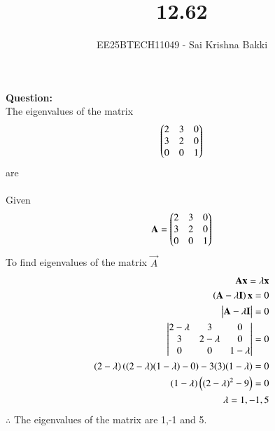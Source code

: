 \documentclass[journal]{IEEEtran}
\begin{document}

\vspace{3cm}

\title{12.62}
\author{EE25BTECH11049 - Sai Krishna Bakki}
\maketitle
\textbf{Question:}\\
The eigenvalues of the matrix 
\begin{align*}
    \begin{pmatrix}2&3&0\\3&2&0\\0&0&1\end{pmatrix}
\end{align*}
are\\
\solution\\
Given\\
\begin{align}
    \mathbf{A}=\begin{pmatrix}2&3&0\\3&2&0\\0&0&1\end{pmatrix}
\end{align}
To find eigenvalues of the matrix $\vec{A}$
\begin{align}
    \mathbf{A}\mathbf{x}=\lambda\mathbf{x}\\
    \left(\mathbf{A}-\lambda\mathbf{I}\right)\mathbf{x}=0\\
    \begin{vmatrix}\mathbf{A}-\lambda\mathbf{I}\end{vmatrix}=0\\
    \begin{vmatrix}2-\lambda&3&0\\3&2-\lambda&0\\0&0&1-\lambda\end{vmatrix}=0\\
    (2-\lambda)\left((2-\lambda)(1-\lambda)-0\right)-3(3)(1-\lambda)=0\\
    (1-\lambda)\left((2-\lambda)^2-9\right)=0\\
    \lambda=1,-1,5
\end{align}
$\therefore$ The eigenvalues of the matrix are 1,-1 and 5.
\end{document}
